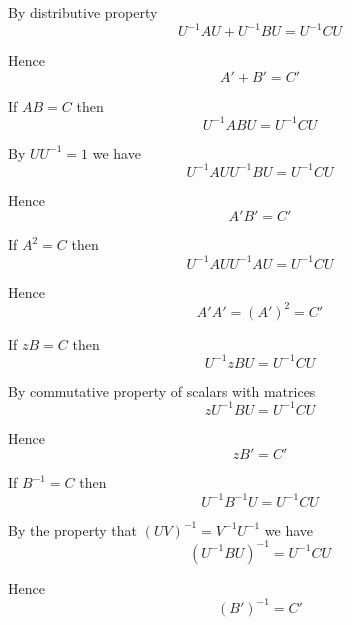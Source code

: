 By distributive property
\begin{equation*}
U^{-1}AU+U^{-1}BU=U^{-1}CU
\end{equation*}

Hence
\begin{equation*}
A'+B'=C'
\end{equation*}

If $AB=C$ then
\begin{equation*}
U^{-1}ABU=U^{-1}CU
\end{equation*}

By $UU^{-1}=1$ we have
\begin{equation*}
U^{-1}AUU^{-1}BU=U^{-1}CU
\end{equation*}

Hence
\begin{equation*}
A'B'=C'
\end{equation*}

If $A^2=C$ then
\begin{equation*}
U^{-1}AUU^{-1}AU=U^{-1}CU
\end{equation*}

Hence
\begin{equation*}
A'A'=(A')^2=C'
\end{equation*}

If $zB=C$ then
\begin{equation*}
U^{-1}zBU=U^{-1}CU
\end{equation*}

By commutative property of scalars with matrices
\begin{equation*}
zU^{-1}BU=U^{-1}CU
\end{equation*}

Hence
\begin{equation*}
zB'=C'
\end{equation*}

If $B^{-1}=C$ then
\begin{equation*}
U^{-1}B^{-1}U=U^{-1}CU
\end{equation*}

By the property that $(UV)^{-1}=V^{-1}U^{-1}$ we have
\begin{equation*}
(U^{-1}BU)^{-1}=U^{-1}CU
\end{equation*}

Hence
\begin{equation*}
(B')^{-1}=C'
\end{equation*}


